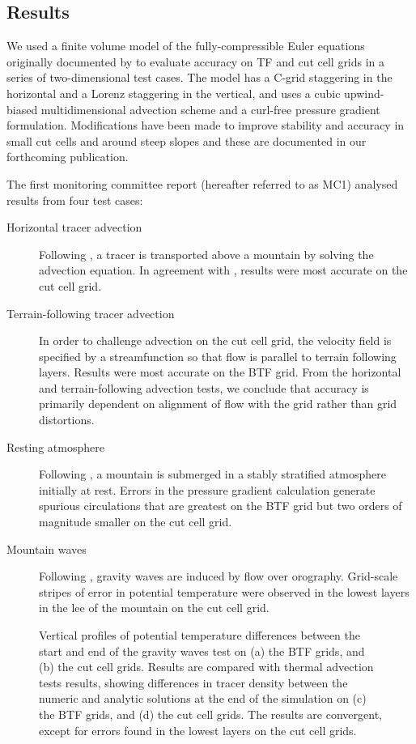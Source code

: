 \documentclass[a4paper]{article}
\begin{document}
\subsection{Results}
We used a finite volume model of the fully-compressible Euler equations originally documented by \citet{weller-shahrokhi2014} to evaluate accuracy on TF and cut cell grids in a series of two-dimensional test cases.  The model has a C-grid staggering in the horizontal and a Lorenz staggering in the vertical, and uses a cubic upwind-biased multidimensional advection scheme and a curl-free pressure gradient formulation.  Modifications have been made to improve stability and accuracy in small cut cells and around steep slopes and these are documented in our forthcoming publication.

The first monitoring committee report (hereafter referred to as MC1) analysed results from four test cases:
\begin{description}
	\item[Horizontal tracer advection]{Following \citet{schaer2002}, a tracer is transported above a mountain by solving the advection equation.  In agreement with \citet{good2014}, results were most accurate on the cut cell grid.}
	\item[Terrain-following tracer advection]{In order to challenge advection on the cut cell grid, the velocity field is specified by a streamfunction so that flow is parallel to terrain following layers.  Results were most accurate on the BTF grid.  From the horizontal and terrain-following advection tests, we conclude that accuracy is primarily dependent on alignment of flow with the grid rather than grid distortions.}
	\item[Resting atmosphere]{Following \citet{klemp2011}, a mountain is submerged in a stably stratified atmosphere initially at rest.  Errors in the pressure gradient calculation generate spurious circulations that are greatest on the BTF grid but two orders of magnitude smaller on the cut cell grid.}
	\item[Mountain waves]{Following \citet{schaer2002}, gravity waves are induced by flow over orography.  Grid-scale stripes of error in potential temperature were observed in the lowest layers in the lee of the mountain on the cut cell grid.}
\end{description}

\begin{figure}
	\centering
	\footnotesize
	
%
	\caption{Vertical profiles of potential temperature differences between the start and end of the gravity waves test on (a) the BTF grids, and (b) the cut cell grids.  Results are compared with thermal advection tests results, showing differences in tracer density between the numeric and analytic solutions at the end of the simulation on (c) the BTF grids, and (d) the cut cell grids.  The results are convergent, except for errors found in the lowest layers on the cut cell grids.}
	\label{fig:sampleLines}
\end{figure}
\end{document}
